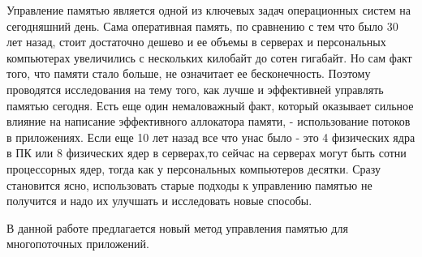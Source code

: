 \Introduction

Управление памятью является одной из ключевых задач операционных систем на сегодняшний день. Сама оперативная память, по сравнению с тем что было 30 лет назад,  стоит достаточно  дешево и ее объемы в серверах и персональных компьютерах   увеличились с нескольких килобайт до сотен гигабайт. Но сам факт   того, что памяти стало больше, не означитает ее бесконечность. Поэтому проводятся исследования на тему того, как лучше и эффективней управлять памятью   сегодня. Есть еще один немаловажный факт, который оказывает  сильное влияние на написание эффективного аллокатора памяти, - использование потоков в приложениях. Если еще 10 лет назад все что унас было - это 4 физических ядра в ПК или 8 физических ядер в серверах,то сейчас на серверах могут быть сотни процессорных ядер, тогда как у персональных компьютеров десятки. Сразу становится ясно, использовать старые подходы к управлению памятью не получится и надо их улучшать и исследовать новые способы.

В данной работе предлагается новый метод управления памятью для многопоточных приложений.
